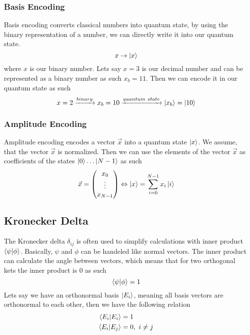 \subsubsection{Basis Encoding}
Basis encoding converts classical numbers into quantum state, by using the binary representation of a number, we can directly write it into our quantum state. 
\begin{equation}
    x \rightarrow \ket {x}
\end{equation}
where $x$ is our binary number.
Lets say $x=3$ is our decimal number and can be represented as a binary number as such $x_b = 11$.
Then we can encode it in our quantum state as such
\begin{equation}
    x=2 \xrightarrow[]{binary} x_b = 10 \xrightarrow[]{quantum\  state} \ket{x_b} = \ket{10}
\end{equation}

\subsubsection{Amplitude Encoding}
Amplitude encoding encodes a vector $\vec x$ into a quantum state $\ket x$. 
We assume, that the vector $\vec x$ is normalized. 
Then we can use the elements of the vector $\vec x$ as coefficients of the states $\ket 0 \dots \ket {N-1}$ as such
\begin{equation}
    \vec{x} = \begin{pmatrix} x_0\\ \vdots \\ x_{N-1} \end{pmatrix} 
    \Leftrightarrow  
     \ket x = \sum_{i=0}^{N-1} x_i \ket i
\end{equation}

\subsection{Kronecker Delta}
The Kronecker delta $\delta_{ij}$ is often used to simplify calculations with inner product $\braket{\psi | \phi}$.
Basically, $\psi$ and $\phi$ can be handeled like normal vectors. 
The inner product can calculate the angle between vectors, which means that for two orthogonal kets the inner product is $0$ as such
\begin{equation}
\braket{\psi|\phi} = 1
\end{equation}
Lets say we have an orthonormal basis $\ket{E_i}$, meaning all basis vectors are orthonormal to each other, then we have the following relation
\begin{equation}
\begin{split}
\braket{E_i|E_i} &= 1\\
\braket{E_i|E_j} &= 0, \ i\neq j
\end{split}
\end{equation}

